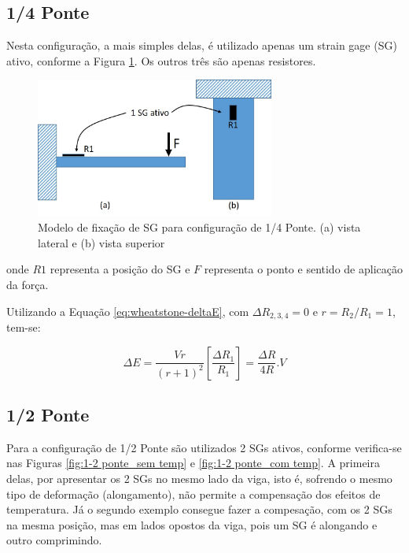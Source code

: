 \documentclass[a4paper]{instrumentacao}
\begin{document}
\subsection{1/4 Ponte}

Nesta configuração, a mais simples delas, é utilizado apenas um strain gage (SG) ativo, conforme a Figura \ref{fig:1-4 ponte}. Os outros três são apenas resistores.

\begin{figure}[H]
\center
\includegraphics[width=0.7\textwidth]{1-4 ponte.jpg}
\caption{Modelo de fixação de SG para configuração de 1/4 Ponte. (a) vista lateral e (b) vista superior}
\label{fig:1-4 ponte}
\end{figure}

\noindent onde $R1$ representa a posição do SG e $F$ representa o ponto e sentido de aplicação da força.

Utilizando a Equação \ref{eq:wheatstone-deltaE}, com $\Delta R_{2,3,4}=0$ e $r=R_2/R_1=1$, tem-se:

\begin{equation}
	\Delta E=\frac{V r}{(r+1)^2}\left [ \frac{\Delta R_1}{R_1} \right ]=\frac{\Delta R}{4R}.V
	\label{eq:wheatstone-deltaE-1_4ponte}
\end{equation}

\subsection{1/2 Ponte}

Para a configuração de 1/2 Ponte são utilizados 2 SGs ativos, conforme verifica-se nas Figuras \ref{fig:1-2 ponte_sem temp} e \ref{fig:1-2 ponte_com temp}. A primeira delas, por apresentar os 2 SGs no mesmo lado da viga, isto é, sofrendo o mesmo tipo de deformação (alongamento), não permite a compensação dos efeitos de temperatura. Já o segundo exemplo consegue fazer a compesação, com os 2 SGs na mesma posição, mas em lados opostos da viga, pois um SG é alongando e outro comprimindo.
\end{document}
